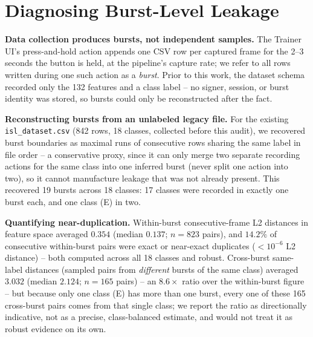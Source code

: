\documentclass[runningheads]{llncs}
\begin{document}
\section{Diagnosing Burst-Level Leakage}

\textbf{Data collection produces bursts, not independent samples.} The
Trainer UI's press-and-hold action appends one CSV row per captured frame
for the 2--3 seconds the button is held, at the pipeline's capture rate;
we refer to all rows written during one such action as a \emph{burst}.
Prior to this work, the dataset schema recorded only the 132 features and
a class label -- no signer, session, or burst identity was stored, so
bursts could only be reconstructed after the fact.

\textbf{Reconstructing bursts from an unlabeled legacy file.} For the
existing \texttt{isl\_dataset.csv} (842 rows, 18 classes, collected before
this audit), we recovered burst boundaries as maximal runs of
consecutive rows sharing the same label in file order -- a conservative
proxy, since it can only merge two separate recording actions for the
same class into one inferred burst (never split one action into two), so
it cannot manufacture leakage that was not already present. This
recovered 19 bursts across 18 classes: 17 classes were recorded in
exactly one burst each, and one class (\textsc{E}) in two.

\textbf{Quantifying near-duplication.} Within-burst consecutive-frame L2
distances in feature space averaged $0.354$ (median $0.137$; $n{=}823$
pairs), and $14.2\%$ of consecutive within-burst pairs were exact or
near-exact duplicates ($<10^{-6}$ L2 distance) -- both computed across all
18 classes and robust. Cross-burst same-label distances (sampled pairs
from \emph{different} bursts of the same class) averaged $3.032$ (median
$2.124$; $n{=}165$ pairs) -- an $8.6\times$ ratio over the within-burst
figure -- but because only one class (\textsc{E}) has more than one
burst, every one of these 165 cross-burst pairs comes from that single
class; we report the ratio as directionally indicative, not as a
precise, class-balanced estimate, and would not treat it as robust
evidence on its own.
\end{document}
